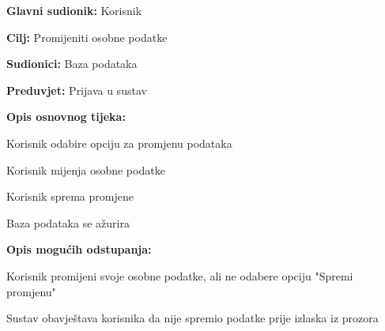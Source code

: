 			\newpage
				\noindent {}
				\begin{packed_item}
					
					\item \textbf{Glavni sudionik: }Korisnik
					\item  \textbf{Cilj:} Promijeniti osobne podatke
					\item  \textbf{Sudionici:} Baza podataka
					\item  \textbf{Preduvjet:} Prijava u sustav
					\item  \textbf{Opis osnovnog tijeka:}
					
					\item[] \begin{packed_enum}
						
						\item Korisnik odabire opciju za promjenu podataka
						\item Korisnik mijenja osobne podatke
						\item Korisnik sprema promjene
						\item Baza podataka se ažurira
					\end{packed_enum}
					
					\item  \textbf{Opis mogućih odstupanja:}
					
					\item[] \begin{packed_item}
						
						\item[2.a] Korisnik promijeni svoje osobne podatke, ali ne odabere opciju "Spremi promjenu"
						\item[] \begin{packed_enum}
							
							\item Sustav obavještava korisnika da nije spremio podatke prije izlaska iz prozora\\
							
						\end{packed_enum}
					\end{packed_item}
				\end{packed_item}
				\noindent {}
